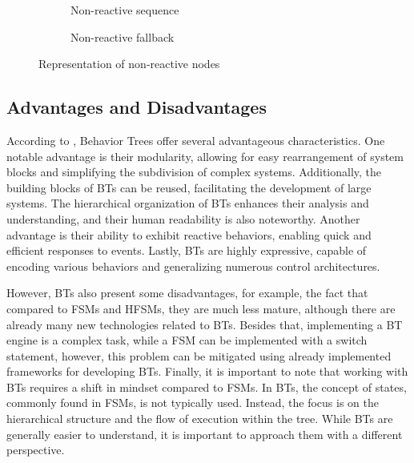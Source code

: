 \begin{figure}[!h]
    \centering
    \begin{subfigure}[b]{.49\linewidth}
        \centering
        \scalebox{1.0} {
            \begin{forest}
            \end{forest}
        }
        \caption{Non-reactive sequence}
    \end{subfigure}
    \hfill
    \begin{subfigure}[b]{.49\linewidth}
        \centering
        \scalebox{1.0} {
            \begin{forest}
            \end{forest}
        }
        \caption{Non-reactive fallback}
    \end{subfigure}
    \caption{Representation of non-reactive nodes}
    \label{fig:background_non_reactive_nodes}
\end{figure}

\subsection{Advantages and Disadvantages}

According to \cite{BTsInRobotics}, Behavior Trees offer several advantageous characteristics. One notable advantage is their modularity, allowing for easy rearrangement of system blocks and simplifying the subdivision of complex systems. Additionally, the building blocks of BTs can be reused, facilitating the development of large systems. The hierarchical organization of BTs enhances their analysis and understanding, and their human readability is also noteworthy. Another advantage is their ability to exhibit reactive behaviors, enabling quick and efficient responses to events. Lastly, BTs are highly expressive, capable of encoding various behaviors and generalizing numerous control architectures.

However, BTs also present some disadvantages, for example, the fact that compared to FSMs and HFSMs, they are much less mature, although there are already many new technologies related to BTs. Besides that, implementing a BT engine is a complex task, while a FSM can be implemented with a switch statement, however, this problem can be mitigated using already implemented frameworks for developing BTs. Finally, it is important to note that working with BTs requires a shift in mindset compared to FSMs. In BTs, the concept of states, commonly found in FSMs, is not typically used. Instead, the focus is on the hierarchical structure and the flow of execution within the tree. While BTs are generally easier to understand, it is important to approach them with a different perspective.

